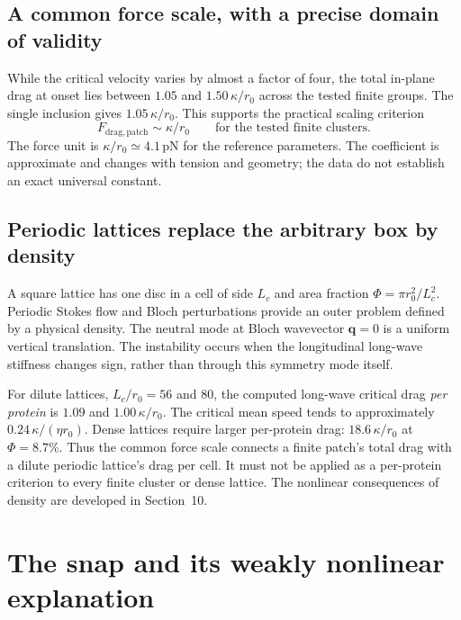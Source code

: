 \subsection{A common force scale, with a precise domain of validity}
While the critical velocity varies by almost a factor of four, the total in-plane drag at onset lies between $1.05$ and $1.50\,\kappa/r_0$ across the tested finite groups. The single inclusion gives $1.05\,\kappa/r_0$. This supports the practical scaling criterion
\begin{equation}
F_{\mathrm{drag,patch}}\sim\kappa/r_0\qquad\text{for the tested finite clusters}.\label{eq:drag}
\end{equation}
The force unit is $\kappa/r_0\simeq4.1\,\mathrm{pN}$ for the reference parameters. The coefficient is approximate and changes with tension and geometry; the data do not establish an exact universal constant.

\subsection{Periodic lattices replace the arbitrary box by density}
A square lattice has one disc in a cell of side $L_c$ and area fraction $\Phi=\pi r_0^2/L_c^2$. Periodic Stokes flow and Bloch perturbations provide an outer problem defined by a physical density. The neutral mode at Bloch wavevector $\bm q=0$ is a uniform vertical translation. The instability occurs when the longitudinal long-wave stiffness changes sign, rather than through this symmetry mode itself.

For dilute lattices, $L_c/r_0=56$ and $80$, the computed long-wave critical drag \emph{per protein} is $1.09$ and $1.00\,\kappa/r_0$. The critical mean speed tends to approximately $0.24\,\kappa/(\eta r_0)$. Dense lattices require larger per-protein drag: $18.6\,\kappa/r_0$ at $\Phi=8.7\%$. Thus the common force scale connects a finite patch's total drag with a dilute periodic lattice's drag per cell. It must not be applied as a per-protein criterion to every finite cluster or dense lattice. The nonlinear consequences of density are developed in Section~10.

\clearpage
\section{The snap and its weakly nonlinear explanation}
